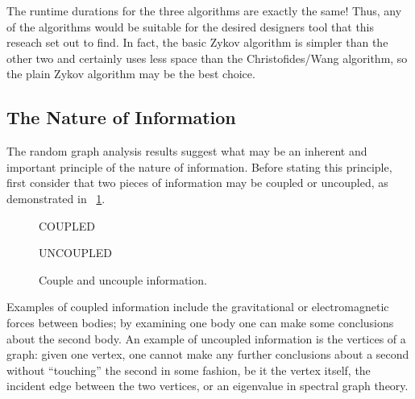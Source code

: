 The runtime durations for the three algorithms are exactly the same!  Thus, any of the algorithms would be suitable
for the desired designers tool that this reseach set out to find.  In fact, the basic Zykov algorithm is simpler
than the other two and certainly uses less space than the Christofides/Wang algorithm, so the plain Zykov algorithm
may be the best choice.

\subsection{The Nature of Information}

The random graph analysis results suggest what may be an inherent and important principle of the nature of
information.  Before stating this principle, first consider that two pieces of information may be coupled or
uncoupled, as demonstrated in \figurename~\ref{fig:info}.

\begin{figure}[H]
  \begin{minipage}{2.5in}
    \centering

    COUPLED
  \end{minipage}
  \begin{minipage}{2.5in}
    \centering

    UNCOUPLED
  \end{minipage}
  \caption{Couple and uncouple information.}
  \label{fig:info}
\end{figure}

Examples of coupled information include the gravitational or electromagnetic forces between bodies; by examining
one body one can make some conclusions about the second body.  An example of uncoupled information is the vertices
of a graph: given one vertex, one cannot make any further conclusions about a second without ``touching'' the
second in some fashion, be it the vertex itself, the incident edge between the two vertices, or an eigenvalue in
spectral graph theory.

